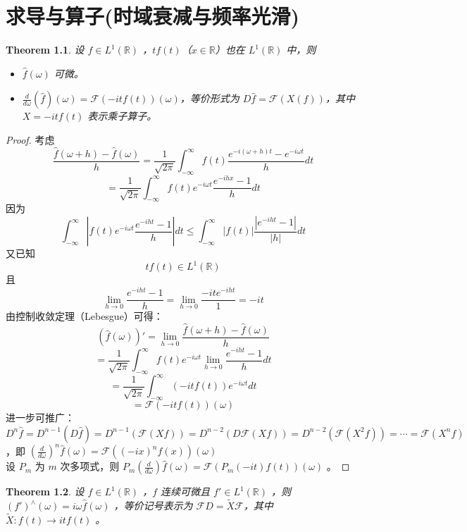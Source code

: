 \documentclass[linespread=1.5,openany]{book}%
\theoremstyle{plain}
\newtheorem{theorem}{Theorem}
\begin{document}
{			\chapter{求导与算子(时域衰减与频率光滑)}
			{
				\begin{theorem}
					设 \(f \in L^1(\mathbb{R})\) ，\(tf(t)\)（\(x\in\mathbb{R}\)）也在 \(L^1(\mathbb{R})\) 中，则
					\begin{itemize}
						\item[(i)] \(\hat{f}(\omega)\) 可微。
						\item[(ii)] \(\frac{d}{d\omega}(\hat{f})(\omega)=\mathcal{F}(-itf(t))(\omega)\)，等价形式为 \(D\hat{f}=\mathcal{F}(X(f))\)，其中 \(X = -itf(t)\) 表示乘子算子。
					\end{itemize}
				\end{theorem}
				
				\begin{proof}
					考虑 \[\frac{\hat{f}(\omega + h)-\hat{f}(\omega)}{h}=\frac{1}{\sqrt{2\pi}}\int_{-\infty}^{\infty}f(t)\frac{e^{-i(\omega + h)t}-e^{-i\omega t}}{h}dt\]
					\[=\frac{1}{\sqrt{2\pi}}\int_{-\infty}^{\infty}f(t)e^{-i\omega t}\frac{e^{-ihx}-1}{h}dt\]
					因为 \[\int_{-\infty}^{\infty}|f(t)e^{-i\omega t}\frac{e^{-iht}-1}{h}|dt\leq\int_{-\infty}^{\infty}|f(t)|\frac{|e^{-iht}-1|}{|h|}dt\] 又已知 \[tf(t)\in L^1(\mathbb{R})\] 且 \[\lim_{h \to 0}\frac{e^{-iht}-1}{h}=\lim_{h \to 0}\frac{-it e^{-iht}}{1}=-it\] 
					由控制收敛定理（Lebesgue）可得：
					\[
					(\hat{f}(\omega))'=\lim_{h \to 0}\frac{\hat{f}(\omega + h)-\hat{f}(\omega)}{h}\]
					\[=\frac{1}{\sqrt{2\pi}}\int_{-\infty}^{\infty}f(t)e^{-i\omega t}\lim_{h \to 0}\frac{e^{-iht}-1}{h}dt\]
					\[=\frac{1}{\sqrt{2\pi}}\int_{-\infty}^{\infty}(-itf(t))e^{-i\omega t}dt\]
					\[=\mathcal{F}(-itf(t))(\omega)
					\]进一步可推广：\[D^n\hat{f}=D^{n - 1}(D\hat{f})=D^{n - 1}(\mathcal{F}(Xf))=D^{n - 2}(D\mathcal{F}(Xf))=D^{n - 2}(\mathcal{F}(X^2f))=\cdots=\mathcal{F}(X^nf)\] ，即 \((\frac{d}{d\omega})^n\hat{f}(\omega)=\mathcal{F}((-ix)^nf(x))(\omega)\) \\
					设 \(P_m\) 为 \(m\) 次多项式，则 \(P_m(\frac{d}{d\omega})\hat{f}(\omega)=\mathcal{F}(P_m(-it)f(t))(\omega)\) 。
				\end{proof}
				\begin{theorem}
					设 \(f \in L^1(\mathbb{R})\) ，\(f\) 连续可微且 \(f'\in L^1(\mathbb{R})\) ，则 \((f')^{\wedge}(\omega)=i\omega\hat{f}(\omega)\) ，等价记号表示为 \(\mathcal{F}D=\tilde{X}\mathcal{F}\)，其中 \(\tilde{X}:f(t)\to itf(t)\) 。
				\end{theorem}
				
}}
\end{document}
